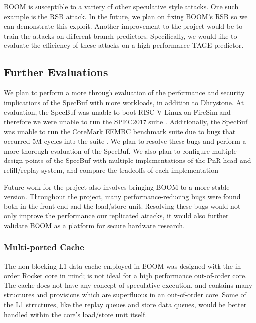 BOOM is susceptible to a variety of other speculative style attacks. One such example is the RSB
attack. In the future, we plan on fixing BOOM's RSB so we can demonstrate this exploit.
Another improvement to the project would be to train the attacks on different branch predictors.
Specifically, we would like to evaluate the efficiency of these attacks on a high-performance
TAGE predictor.

\subsection{Further Evaluations}

We plan to perform a more through evaluation of the performance and security implications of the
SpecBuf with more workloads, in addition to Dhrystone. At evaluation, the SpecBuf was unable to boot
RISC-V Linux on FireSim and therefore we were unable to run the SPEC2017 suite \cite{b50}.
Additionally, the SpecBuf was unable to run the CoreMark EEMBC benchmark suite due to bugs that
occurred 5M cycles into the suite \cite{b51}. We plan to resolve these bugs and perform a more
thorough evaluation of the SpecBuf. We also plan to configure multiple design
points of the SpecBuf with multiple implementations of the PnR head and refill/replay system, and compare the tradeoffs of each implementation.



Future work for the project also involves bringing BOOM to a more stable version. Throughout
the project, many performance-reducing bugs were found both in the front-end and the 
load/store unit. Resolving these bugs would not only improve the performance our replicated attacks,
it would also further validate BOOM as a platform for secure hardware research.

\subsubsection{Multi-ported Cache}
The non-blocking L1 data cache employed in BOOM was designed with the in-order Rocket core in mind;
is not ideal for a high performance out-of-order core. The cache does not have any concept of
speculative execution, and contains many structures and provisions which are superfluous in an
out-of-order core. Some of the L1 structures, like the replay queues and store data queues, would be
better handled within the core's load/store unit itself.

